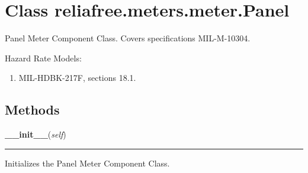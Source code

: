 %
%
%


\section{Class reliafree.meters.meter.Panel}

    \label{reliafree:meters:meter:Panel}
Panel Meter Component Class. Covers specifications MIL-M-10304.

Hazard Rate Models:

\begin{enumerate}

\setlength{\parskip}{0.5ex}
  \item MIL-HDBK-217F, sections 18.1.

\end{enumerate}



  \subsection{Methods}

    \label{reliafree:meters:meter:Panel:__init__}

    \vspace{0.5ex}

\hspace{.8\funcindent}\begin{boxedminipage}{\funcwidth}

    \raggedright \textbf{\_\_init\_\_}(\textit{self})

    \vspace{-1.5ex}

    \rule{\textwidth}{0.5\fboxrule}
\setlength{\parskip}{2ex}
    Initializes the Panel Meter Component Class.

\setlength{\parskip}{1ex}
    \end{boxedminipage}

